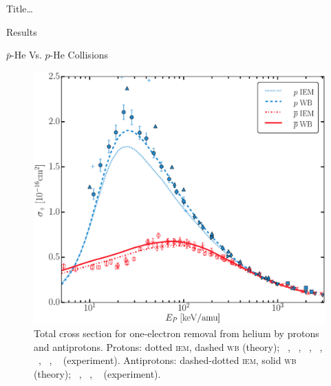 \documentclass[letterpaper, 10 pt]{report}
\begin{document}
\begin{chapter}{ Title\dots \label{chap:p-he2p-he}}
\begin{section}{Results \label{sec:phe2p-res}}
\begin{subsection}{ \texorpdfstring{$\bar{p}$}{pbar}-He Vs. \texorpdfstring{$p$}{p}-He Collisions
                         \label{sec:pbarhe-res}}
\begin{figure}[ht]
\begin{minipage}{.49\linewidth}
               \centering
               \includegraphics[width = \linewidth]{./images/pbarhe/pbarhe-+.eps}
               \caption[Total cross section for one-electron removal from helium by protons and
                        antiprotons.]
                       {Total cross section for one-electron removal from helium by protons and
                        antiprotons. Protons: dotted \textsc{iem}, dashed \textsc{wb} (theory);
                        {\color{blue}{$\blacktriangle$}}~\cite{DTR84}, {\color{blue}{$+$}}~\cite{Sol62},
                        {\color{blue}{$\bullet$}}~\cite{SG89},
                        {\color{blue}{$\blacklozenge$}}~\cite{SG85},
                        {\color{blue}{$\blacktriangleright$}}~\cite{PM70},
                        {\color{blue}{$\blacktriangledown$}}~\cite{Wex64},
                        {\color{blue}{$\blacksquare$}}~\cite{KAH84} (experiment).
                        Antiprotons: dashed-dotted \textsc{iem}, solid \textsc{wb} (theory);
                        {\color{red}{$\Box$}}~\cite{KKT08}, {\color{red}{$\circ$}}~\cite{HKM94},
                        {\color{red}{$\times$}}~\cite{AHK90} (experiment). \label{fig:he+}}
            \end{minipage} \hspace{0.04\linewidth} %
            \begin{minipage}{.49\linewidth}


\end{minipage}
\end{figure}
\end{subsection}
\end{section}
\end{chapter}
\end{document}
